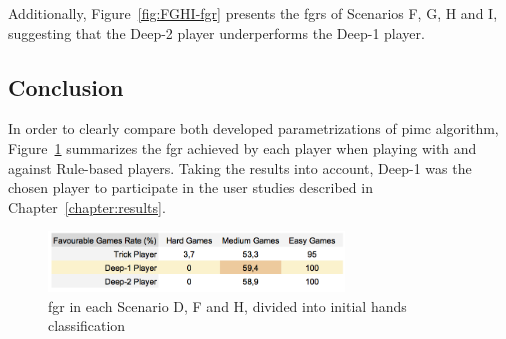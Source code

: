 Additionally, Figure~\ref{fig:FGHI-fgr} presents the \acp{fgr} of Scenarios F, G, H and I, suggesting that the Deep-2 player underperforms the Deep-1 player.

\subsection{Conclusion}

In order to clearly compare both developed parametrizations of \ac{pimc} algorithm, Figure~\ref{fig:DFH-fgr} summarizes the \ac{fgr} achieved by each player when playing with and against Rule-based players.
Taking the results into account, Deep-1 was the chosen player to participate in the user studies described in Chapter~\ref{chapter:results}.

\begin{figure}[h!]
  \centering
    \includegraphics[width=0.7\textwidth]{./img/4/DFH-fgr}
  \caption{\ac{fgr} in each Scenario D, F and H, divided into initial hands classification}
\label{fig:DFH-fgr}
\end{figure}
